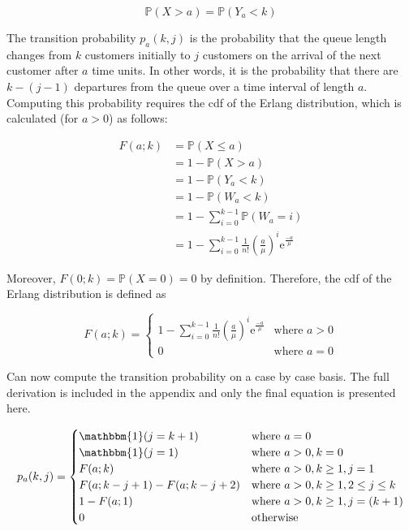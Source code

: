 \begin{equation}
	\mathbb{P} (X > a) = \mathbb{P} (Y_{a} < k)
\end{equation}

The transition probability $p_{a} (k, j)$ is the probability that the queue length changes from $k$ customers initially to $j$ customers on the arrival of the next customer after $a$ time units. In other words, it is the probability that there are $k - (j - 1)$ departures from the queue over a time interval of length $a$. Computing this probability requires the cdf of the Erlang distribution, which is calculated (for $a > 0$) as follows:

\begin{align*}
	F (a; k) & = \mathbb{P} (X \leq a) \\
	& = 1 - \mathbb{P} (X > a) \\
	& = 1 - \mathbb{P} (Y_{a} < k) \\
	& = 1 - \mathbb{P} (W_{a} < k) \\
	& = 1 - \sum_{i = 0}^{k - 1} \mathbb{P} (W_{a} = i) \\
	& = 1 - \sum_{i = 0}^{k - 1} \frac{1}{n!} \left( \frac{a}{\mu} \right)^{i} \mathrm{e}^{\frac{-a}{\mu}}
\end{align*}

Moreover, $F (0; k) = \mathbb{P} (X = 0) = 0$ by definition. Therefore, the cdf of the Erlang distribution is defined as

\begin{equation}
	F (a; k) = \begin{cases} 1 - \sum_{i = 0}^{k - 1} \frac{1}{n!} \left( \frac{a}{\mu} \right)^{i} \mathrm{e}^{\frac{-a}{\mu}} & \text{where $a > 0$} \\ 0 & \text{where $a = 0$} \end{cases}
\end{equation}

Can now compute the transition probability on a case by case basis. The full derivation is included in the appendix and only the final equation is presented here.

\begin{equation}
	p_{a} (k, j) = \begin{cases} \mathbbm{1} (j = k + 1) & \text{where $a = 0$} \\ \mathbbm{1} (j = 1) & \text{where $a > 0, k = 0$} \\ F (a; k) & \text{where $a > 0, k \geq 1, j = 1$} \\ F(a; k - j + 1) - F (a; k - j + 2) & \text{where $a > 0, k \geq 1, 2 \leq j \leq k$} \\ 1 - F(a; 1) & \text{where $a > 0, k \geq 1, j = (k + 1)$} \\ 0 & \text{otherwise} \end{cases}
\end{equation}

